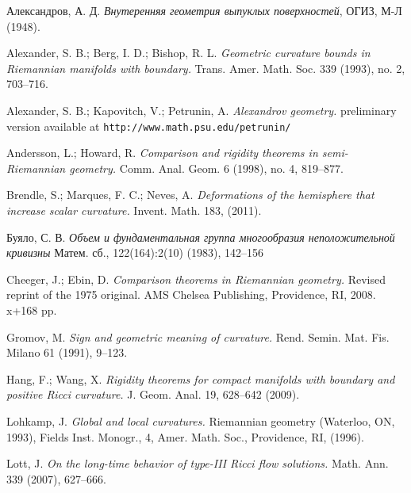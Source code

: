 \documentclass[oneside,a4paper]{article}
\begin{document}
\begin{thebibliography}{52}

\begin{otherlanguage}{russian}
Александров, А. Д. \textit{Внутеренняя геометрия выпуклых поверхностей}, ОГИЗ, М-Л (1948).
\end{otherlanguage}

Alexander, S. B.; Berg, I. D.; Bishop, R. L. \textit{Geometric curvature bounds in Riemannian manifolds with boundary.} Trans. Amer. Math. Soc. 339 (1993), no. 2, 703--716.

Alexander, S. B.; Kapovitch, V.; Petrunin, A. \textit{Alexandrov geometry.}
preliminary version available at {\tt http://www.math.psu.edu/petrunin/}

Andersson, L.; Howard, R.
\textit{Comparison and rigidity theorems in semi-Riemannian geometry.}
Comm. Anal. Geom. 6 (1998), no. 4, 819--877.

Brendle, S.; Marques, F. C.;  Neves, A.
\textit{Deformations of the hemisphere that increase scalar curvature.}
Invent. Math.  183,  (2011).

  \begin{otherlanguage}{russian}
Буяло, С. В. \textit{Объем и фундаментальная группа многообразия неположительной кривизны}
Матем. сб., 122(164):2(10) (1983),  142--156                   
\end{otherlanguage}

Cheeger, J.; Ebin, D. \textit{Comparison theorems in Riemannian geometry.} Revised reprint of the 1975 original. AMS Chelsea Publishing, Providence, RI, 2008. x+168 pp.

 Gromov, M. \textit{Sign and geometric meaning of curvature.}
Rend. Semin. Mat. Fis. Milano 61 (1991), 9--123.

Hang, F.; Wang, X.  \textit{Rigidity theorems for compact manifolds with boundary and
positive Ricci curvature.} J. Geom. Anal. 19, 628--642 (2009).


 Lohkamp, J. \textit{Global and local curvatures.} Riemannian geometry (Waterloo, ON, 1993), Fields Inst. Monogr., 4, Amer. Math. Soc., Providence, RI, (1996).

  Lott, J. \textit{On the long-time behavior of type-III Ricci flow solutions.} Math. Ann. 339 (2007),
627--666.


\end{thebibliography}
\end{document}
